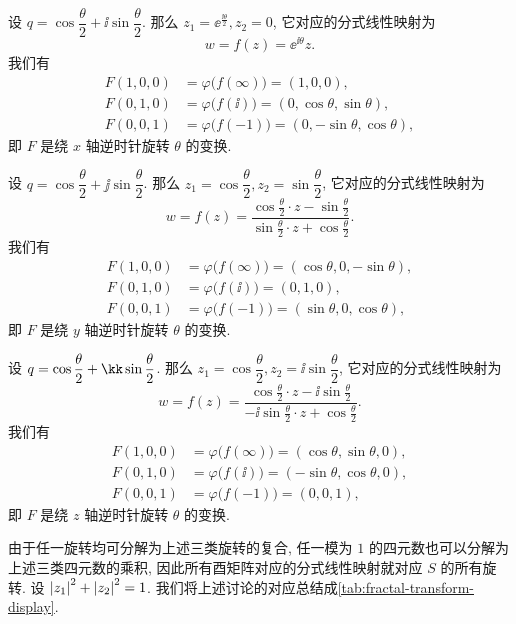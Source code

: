 \begin{exampleenum}
  \item 设 $q=\cos\dfrac\theta2+\ii\sin\dfrac\theta 2$.
  那么 $z_1=\ee^{\frac{\ii\theta}2}, z_2=0$, 它对应的分式线性映射为
  \[
    w=f(z)=\ee^{\ii\theta}z.
  \]
  我们有
  \begin{align*}
      F(1,0,0)&
    =\varphi\bigl(f(\infty)\bigr)
    =(1,0,0),\\
      F(0,1,0)&
    =\varphi\bigl(f(\ii)\bigr)
    =(0,\cos\theta,\sin\theta),\\
      F(0,0,1)&
    =\varphi\bigl(f(-1)\bigr)
    =(0,-\sin\theta,\cos\theta),
  \end{align*}
  即 $F$ 是绕 $x$ 轴逆时针旋转 $\theta$ 的变换.
  \item 设 $q=\cos\dfrac\theta2+\jj\sin\dfrac\theta 2$.
  那么 $z_1=\cos\dfrac\theta2, z_2=\sin\dfrac\theta2$, 它对应的分式线性映射为
  \[
    w=f(z)=\frac{\cos \frac\theta2 \cdot z-\sin\frac\theta2}{\sin\frac\theta2 \cdot z+\cos\frac\theta2}.
  \]
  我们有
  \begin{align*}
      F(1,0,0)&
    =\varphi\bigl(f(\infty)\bigr)
    =(\cos\theta,0,-\sin\theta),\\
      F(0,1,0)&
    =\varphi\bigl(f(\ii)\bigr)
    =(0,1,0),\\
      F(0,0,1)&
    =\varphi\bigl(f(-1)\bigr)
    =(\sin\theta,0,\cos\theta),
  \end{align*}
  即 $F$ 是绕 $y$ 轴逆时针旋转 $\theta$ 的变换.
  \item 设 $q=\cos\dfrac\theta2+\kk\sin\dfrac\theta 2$.
  那么 $z_1=\cos\dfrac\theta2, z_2=\ii\sin\dfrac\theta2$, 它对应的分式线性映射为
  \[
    w=f(z)=\frac{\cos \frac\theta2 \cdot z-\ii \sin\frac\theta2}{-\ii\sin\frac\theta2 \cdot z+\cos\frac\theta2}.
  \]
  我们有
  \begin{align*}
      F(1,0,0)&
    =\varphi\bigl(f(\infty)\bigr)
    =(\cos\theta,\sin\theta,0),\\
      F(0,1,0)&
    =\varphi\bigl(f(\ii)\bigr)
    =(-\sin\theta,\cos\theta,0),\\
      F(0,0,1)&
    =\varphi\bigl(f(-1)\bigr)
    =(0,0,1),
  \end{align*}
  即 $F$ 是绕 $z$ 轴逆时针旋转 $\theta$ 的变换.
\end{exampleenum}

由于任一旋转均可分解为上述三类旋转的复合, 任一模为 $1$ 的四元数也可以分解为上述三类四元数的乘积, 因此所有酉矩阵对应的分式线性映射就对应 $S$ 的所有旋转.
设 $\left|z_1\right|^2+\left|z_2\right|^2=1$.
我们将上述讨论的对应总结成\ref{tab:fractal-transform-display}.

